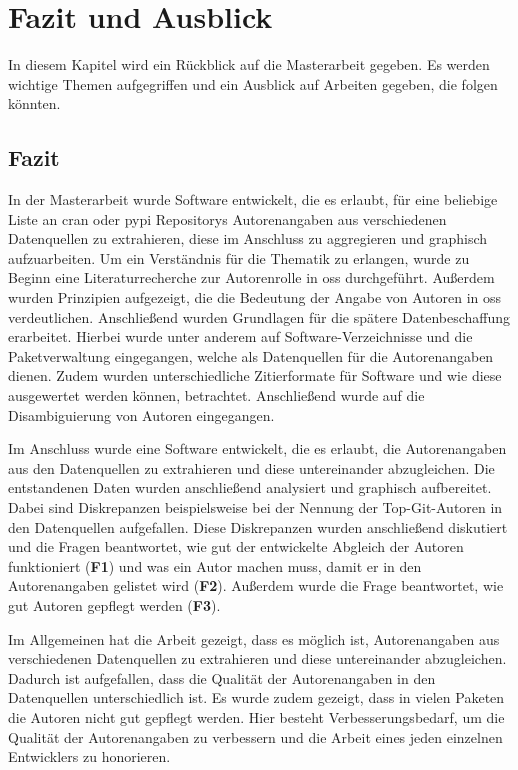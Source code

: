 \chapter{Fazit und Ausblick}
\label{cap:fazit_ausblick}
In diesem Kapitel wird ein Rückblick auf die Masterarbeit gegeben. Es werden wichtige Themen aufgegriffen und ein Ausblick auf Arbeiten gegeben, die folgen könnten.

\section{Fazit}
\label{sec:fazit}
In der Masterarbeit wurde Software entwickelt, die es erlaubt, für eine beliebige Liste an \gls{cran} oder \gls{pypi} Repositorys Autorenangaben aus verschiedenen Datenquellen zu extrahieren, diese im Anschluss zu aggregieren und graphisch aufzuarbeiten.
Um ein Verständnis für die Thematik zu erlangen, wurde zu Beginn eine Literaturrecherche zur Autorenrolle in \gls{oss} durchgeführt.
Außerdem wurden Prinzipien aufgezeigt, die die Bedeutung der Angabe von Autoren in \gls{oss} verdeutlichen.
Anschließend wurden Grundlagen für die spätere Datenbeschaffung erarbeitet.
Hierbei wurde unter anderem auf Software-Verzeichnisse und die Paketverwaltung eingegangen, welche als Datenquellen für die Autorenangaben dienen.
Zudem wurden unterschiedliche Zitierformate für Software und wie diese ausgewertet werden können, betrachtet.
Anschließend wurde auf die Disambiguierung von Autoren eingegangen.

Im Anschluss wurde eine Software entwickelt, die es erlaubt, die Autorenangaben aus den Datenquellen zu extrahieren und diese untereinander abzugleichen.
Die entstandenen Daten wurden anschließend analysiert und graphisch aufbereitet.
Dabei sind Diskrepanzen beispielsweise bei der Nennung der Top-Git-Autoren in den Datenquellen aufgefallen.
Diese Diskrepanzen wurden anschließend diskutiert und die Fragen beantwortet, wie gut der entwickelte Abgleich der Autoren funktioniert (\textbf{F1}) und was ein Autor machen muss, damit er in den Autorenangaben gelistet wird (\textbf{F2}).
Außerdem wurde die Frage beantwortet, wie gut Autoren gepflegt werden (\textbf{F3}).

Im Allgemeinen hat die Arbeit gezeigt, dass es möglich ist, Autorenangaben aus verschiedenen Datenquellen zu extrahieren und diese untereinander abzugleichen.
Dadurch ist aufgefallen, dass die Qualität der Autorenangaben in den Datenquellen unterschiedlich ist.
Es wurde zudem gezeigt, dass in vielen Paketen die Autoren nicht gut gepflegt werden.
Hier besteht Verbesserungsbedarf, um die Qualität der Autorenangaben zu verbessern und die Arbeit eines jeden einzelnen Entwicklers zu honorieren.

